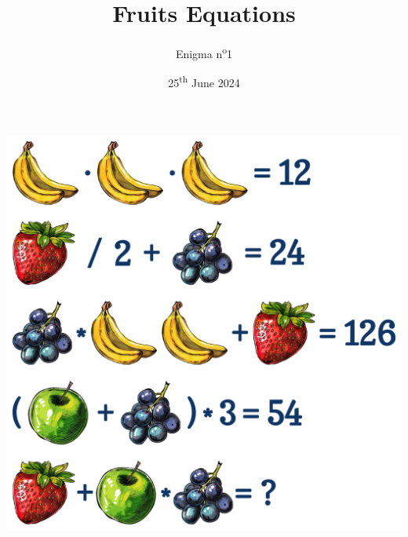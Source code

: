 \documentclass[a4paper, top=10mm]{article}
\title{\textbf{\huge{Fruits Equations}}}
\author{Enigma n\textsuperscript{o}1}
\date{25\textsuperscript{th} June 2024}
\begin{document}
	\maketitle
	
	\vspace{1cm}
	
	\begin{center}
		\includegraphics[width=\linewidth]{01equations.pdf}\\
	\end{center}
	
	
\end{document}

